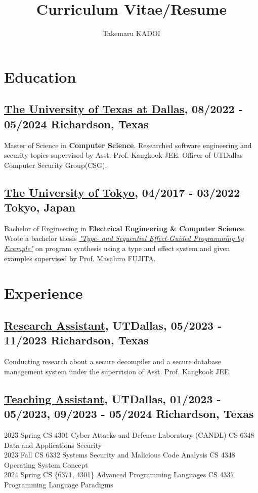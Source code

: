 \documentclass[10pt]{article}
\title{\vspace{-1cm}Curriculum Vitae/Resume}
\author{Takemaru KADOI}
\date{}
\begin{document}
\section*{ Education}
    \subsection*{\underline{The University of Texas at Dallas}, 08/2022 - 05/2024 \hfill Richardson, Texas}
        Master of Science in \textbf{Computer Science}. Researched software engineering and security topics supervised by Asst. Prof. Kangkook JEE. Officer of UTDallas Computer Security Group(CSG).

    \subsection*{\underline{The University of Tokyo}, 04/2017 -  03/2022 \hfill Tokyo, Japan}
        \noindent
        Bachelor of Engineering in \textbf{Electrical Engineering \& Computer Science}. Wrote a bachelor thesis \href{https://github.com/diohabara/bthesis}{\emph{"Type- and Sequential Effect-Guided Programming by Example"}} on program synthesis using a type and effect system and given examples supervised by Prof. Masahiro FUJITA.

\section*{   Experience}
    \subsection*{ \underline{Research Assistant}, UTDallas, 05/2023 - 11/2023 \hfill Richardson, Texas}
        Conducting research about a secure decompiler and a secure database management system under the supervision of Asst. Prof. Kangkook JEE.
    \subsection*{ \underline{Teaching Assistant}, UTDallas, 01/2023 - 05/2023, 09/2023 - 05/2024 \hfill Richardson, Texas}
        2023 Spring
        \faVirus \; CS 4301 Cyber Attacks and Defense Laboratory (CANDL)
        \quad
        \faVirus \; CS 6348 Data and Applications Security
        \\
        2023 Fall
        \faVirus \; CS 6332 Systems Security and Malicious Code Analysis \;
        \quad
        \faWindows \; CS 4348 Operating System Concept
        \\
        2024 Spring
         \;CS \{6371, 4301\} Advanced Programming Languages
        \quad
         \; CS 4337 Programming Language Paradigms
\end{document}
